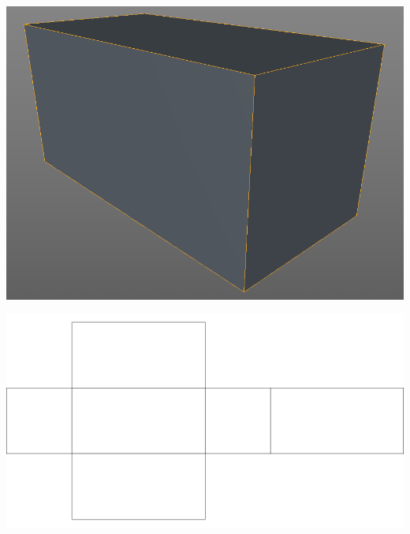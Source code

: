 \begin{fullwidth}
\begin{center}
\includegraphics[width=15cm]{./img/8.3/3D-geo.png}

\includegraphics[width=15cm]{./img/8.3/Geo-map.png}
\end{center}

\end{fullwidth}
